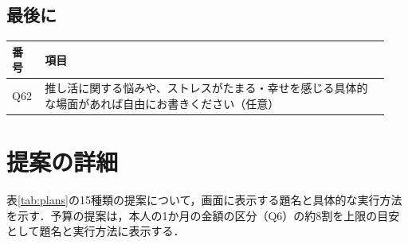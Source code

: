 \section*{最後に}
\begin{longtable}{@{}p{0.08\linewidth}p{0.86\linewidth}@{}}
\toprule 番号 & 項目 \\ \midrule \endhead \bottomrule \endfoot
Q62 & 推し活に関する悩みや、ストレスがたまる・幸せを感じる具体的な場面があれば自由にお書きください（任意） \\
\end{longtable}

\chapter{提案の詳細}
\label{app:plans}
表\ref{tab:plans}の15種類の提案について，画面に表示する題名と具体的な実行方法を示す．予算の提案は，本人の1か月の金額の区分（Q6）の約8割を上限の目安として題名と実行方法に表示する．
